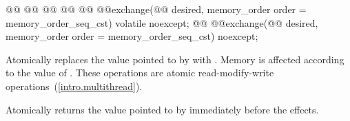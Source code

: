 \begin{itemdescr}
\pnum
\effects {} 

\end{itemdescr}


%
%
%
%
%
\begin{itemdecl}
@@
@@
@@
@@
@@ @@exchange(@@ desired, memory_order order = memory_order_seq_cst) volatile noexcept;
@@ @@exchange(@@ desired, memory_order order = memory_order_seq_cst) noexcept;
\end{itemdecl}

\begin{itemdescr}
\pnum
\effects Atomically replaces the value pointed to  by 
with .
Memory is affected according to the value of .
These operations are atomic read-modify-write operations~(\ref{intro.multithread}).

\pnum
\returns Atomically returns the value pointed to  by  immediately before the effects.
\end{itemdescr}

